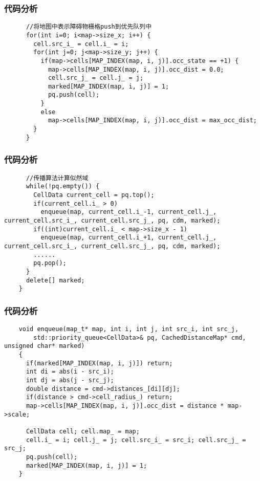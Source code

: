 \begin{frame}[fragile]
  \frametitle{代码分析}
  \begin{lstlisting}
      //将地图中表示障碍物栅格push到优先队列中
      for(int i=0; i<map->size_x; i++) {
        cell.src_i_ = cell.i_ = i;
        for(int j=0; j<map->size_y; j++) {
          if(map->cells[MAP_INDEX(map, i, j)].occ_state == +1) {
            map->cells[MAP_INDEX(map, i, j)].occ_dist = 0.0;
            cell.src_j_ = cell.j_ = j;
            marked[MAP_INDEX(map, i, j)] = 1;
            pq.push(cell);
          }
          else 
            map->cells[MAP_INDEX(map, i, j)].occ_dist = max_occ_dist;
        }
      }
  \end{lstlisting}
\end{frame}

\begin{frame}[fragile]
  \frametitle{代码分析}
  \begin{lstlisting}
      //传播算法计算似然域
      while(!pq.empty()) {
        CellData current_cell = pq.top();
        if(current_cell.i_ > 0)
          enqueue(map, current_cell.i_-1, current_cell.j_, current_cell.src_i_, current_cell.src_j_, pq, cdm, marked);
        if((int)current_cell.i_ < map->size_x - 1)
          enqueue(map, current_cell.i_+1, current_cell.j_, current_cell.src_i_, current_cell.src_j_, pq, cdm, marked);
        ......
        pq.pop();
      }
      delete[] marked;
    }
  \end{lstlisting}
\end{frame}

\begin{frame}[fragile]
  \frametitle{代码分析}
  \begin{lstlisting}
    void enqueue(map_t* map, int i, int j, int src_i, int src_j, 
        std::priority_queue<CellData>& pq, CachedDistanceMap* cmd, unsigned char* marked)
    {
      if(marked[MAP_INDEX(map, i, j)]) return;
      int di = abs(i - src_i);
      int dj = abs(j - src_j);
      double distance = cmd->distances_[di][dj];
      if(distance > cmd->cell_radius_) return;
      map->cells[MAP_INDEX(map, i, j)].occ_dist = distance * map->scale;

      CellData cell; cell.map_ = map;
      cell.i_ = i; cell.j_ = j; cell.src_i_ = src_i; cell.src_j_ = src_j;
      pq.push(cell);
      marked[MAP_INDEX(map, i, j)] = 1;
    }
  \end{lstlisting}
\end{frame}

